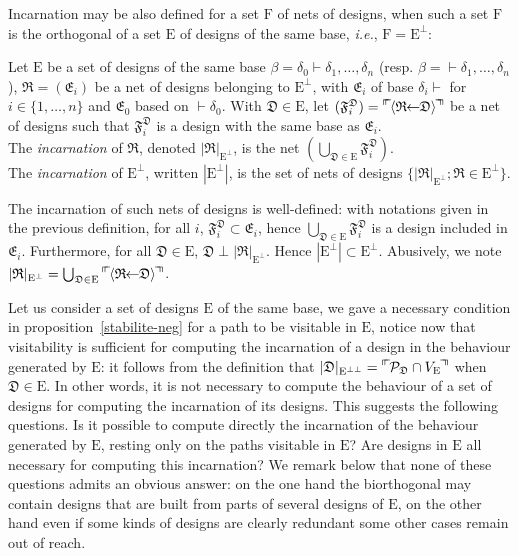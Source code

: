 \documentclass{LMCS}
\def\ie{{\em i.e.}}
\newcommand{\design}[1]{{\mathfrak{#1}}}
\newcommand{\designset}[1]{{\mathrm{#1}}}
\newcommand{\Dincarnation}[2]{|{\design{#1}}|_{\designset{#2}}}
\begin{document}
Incarnation may be also defined for a set $\designset{F}$ of nets of designs, when such a set $\designset{F}$ is the orthogonal of a set $\designset{E}$ of designs of the same base, \ie, $\designset{F} = \designset{E}^\perp$:
\begin{defi}
Let $\designset{E}$ be a set of designs of the same base $\beta=\delta_0\vdash\delta_1,\dots,\delta_n$ (resp. $\beta= \vdash\delta_1,\dots,\delta_n$), $\design{R} = (\design{E}_i)$ be a net of designs belonging to $\designset{E}^\perp$, with $\design{E}_i$ of base $ \delta_i\vdash $ for $i\in\{1,\dots, n\}$ and $\design{E}_0$ based on $\vdash\delta_0$. 
With $\design{D} \in \designset{E}$, let $(\design{F}_i^{\design{D}}) = \normalisationDes{R}{D}$ be a net of designs such that $\design{F}_i^{\design{D}}$ is a design with the same base as $\design{E}_i$.\\
The {\em incarnation} of $\design{R}$, denoted $\Dincarnation{R}{\designset{E}^{\perp}}$, is the net $(\bigcup_{\design{D} \in \designset{E}} \design{F}_i^{\design{D}})$.\\
The {\em incarnation} of $\designset{E}^{\perp}$, written $|\designset{E}^{\perp}|$, is the set of nets of designs $\{\Dincarnation{R}{\designset{E}^{\perp}} ; \design{R} \in \designset{E}^{\perp}\}$.
\end{defi}

The incarnation of such nets of designs is well-defined: with notations given in the previous definition, for all $i$, $\design{F}_i^{\design{D}} \subset \design{E}_i$, hence $\bigcup_{\design{D} \in \designset{E}} \design{F}_i^{\design{D}}$ is a design included in $\design{E}_i$.
Furthermore, for all $\design{D} \in \designset{E}$, $\design{D} \perp \Dincarnation{R}{\designset{E}^{\perp}}$. Hence $|\designset{E}^{\perp}| \subset \designset{E}^{\perp}$.
Abusively, we note $\Dincarnation{R}{\designset{E}^{\perp}} = \bigcup_{\design{D} \in \designset{E}}\normalisationDes{R}{D}$.

\vspace{.5cm}
Let us consider a set of designs $\designset{E}$ of the same base, we
gave a necessary condition in proposition~\ref{stabilite-neg} for a path to be visitable in $\designset{E}$,
 notice now that visitability is sufficient for computing the incarnation of a design in the behaviour generated by $\designset{E}$: it follows from the definition that $|\design{D}|_{\designset{E}^{\perp\perp}} = \fullview{\PoD{\design{D}} \cap V_\designset{E}}$ when $\design{D} \in \designset{E}$. 
In other words, it is not necessary to compute the behaviour of a set of designs for computing the incarnation of its designs.
This suggests the following questions. Is it possible to compute directly the incarnation of the behaviour generated by $\designset{E}$, resting only on the paths visitable in $\designset{E}$? 
Are designs in $\designset{E}$ all necessary for computing this incarnation?
We remark below that none of these questions admits an obvious answer: on the one hand the biorthogonal may contain designs that are built from parts of several designs of $\designset{E}$, on the other hand even if some kinds of designs are clearly redundant some other cases remain out of reach. 
\end{document}
